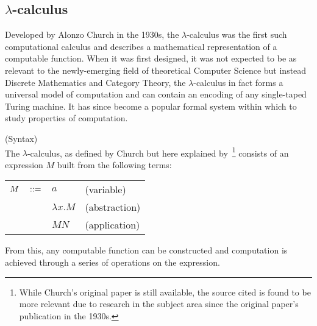 \subsection{\texorpdfstring{$\lambda$-c}{Lambda C}alculus}\label{ssec:lambda-calculus}

    Developed by Alonzo Church in the 1930s, the $\lambda$-calculus was the first such computational calculus and describes a mathematical representation of a computable function.
    When it was first designed, it was not expected to be as relevant to the newly-emerging field of theoretical Computer Science but instead Discrete Mathematics and Category Theory, the $\lambda$-calculus in fact forms a universal model of computation and can contain an encoding of any single-taped Turing machine.
    It has since become a popular formal system within which to study properties of computation.


    \begin{definition}{(Syntax)\\}
        \label{lambda-calculus-syntax}
        The $\lambda$-calculus, as defined by Church but here explained by~\cite{lambda-calculus}\footnote{While Church's original paper is still available, the source cited is found to be more relevant due to research in the subject area since the original paper's publication in the 1930s.} consists of an expression $M$ built from the following terms:
        \begin{center}
            \begin{tabular}{ l l l }
                $M  \quad ::=$       & $a$               & (variable) \\
                                        & $\lambda x . M$   & (abstraction) \\
                                        & $M N$             & (application)
            \end{tabular}
        \end{center}
    \end{definition}
    From this, any computable function can be constructed and computation is achieved through a series of operations on the expression.


